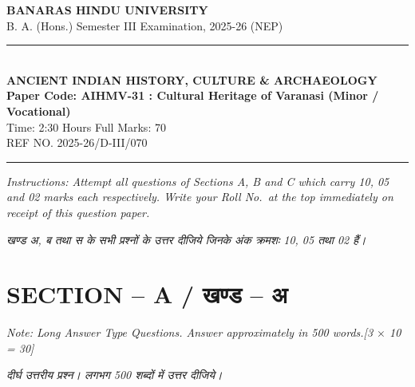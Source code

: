 \documentclass[11pt,a4paper]{article}
\newcommand{\pts}[1]{\hfill \textit{[#1]}}
\begin{document}
\begin{center}
  {\large\bfseries BANARAS HINDU UNIVERSITY}\\[2pt]
  {\normalsize B. A. (Hons.) Semester III Examination, 2025-26 (NEP)}\\[6pt]
  \rule{0.8\linewidth}{0.5pt}\\[6pt]
  {\large\bfseries ANCIENT INDIAN HISTORY, CULTURE \& ARCHAEOLOGY}\\[4pt]
  {\large\bfseries Paper Code: AIHMV-31 : Cultural Heritage of Varanasi (Minor / Vocational)}\\[4pt]
  {\normalsize Time: 2:30 Hours \hfill Full Marks: 70}\\[2pt]
  {\small REF NO. 2025-26/D-III/070}
\end{center}
\rule{\linewidth}{0.4pt}
\smallskip

\noindent \textit{Instructions: Attempt all questions of Sections A, B and C which carry 10, 05 and 02 marks each respectively. Write your Roll No.\ at the top immediately on receipt of this question paper.}

\smallskip
\noindent \textit{खण्ड अ, ब तथा स के सभी प्रश्नों के उत्तर दीजिये जिनके अंक क्रमशः 10, 05 तथा 02 हैं।}

\bigskip

\section*{SECTION -- A / खण्ड -- अ}
\noindent \textit{Note: Long Answer Type Questions. Answer approximately in 500 words.}\pts{3 $\times$ 10 = 30}

\noindent \textit{दीर्घ उत्तरीय प्रश्न। लगभग 500 शब्दों में उत्तर दीजिये।}
\end{document}
